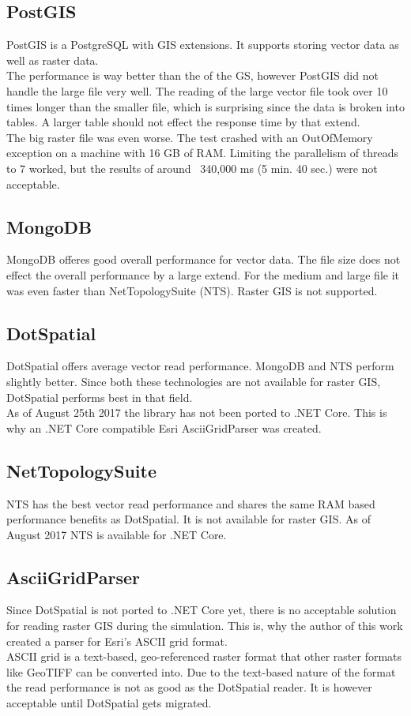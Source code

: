 \subsection{PostGIS}
PostGIS is a PostgreSQL with GIS extensions. It supports storing vector data as well as raster data.\\
The performance is way better than the of the GS, however PostGIS did not handle the large file very well. The reading of the large vector file took over 10 times longer than the smaller file, which is surprising since the data is broken into tables. A larger table should not effect the response time by that extend.\\
The big raster file was even worse. The test crashed with an OutOfMemory exception on a machine with 16 GB of RAM. Limiting the parallelism of threads to 7 worked, but the results of around ~340,000 ms (5 min. 40 sec.) were not acceptable.


\subsection{MongoDB}
MongoDB offeres good overall performance for vector data. The file size does not effect the overall performance by a large extend. For the medium and large file it was even faster than NetTopologySuite (NTS). Raster GIS is not supported.


\subsection{DotSpatial}
DotSpatial offers average vector read performance. MongoDB and NTS perform slightly better. Since both these technologies are not available for raster GIS, DotSpatial performs best in that field.\\
As of August 25th 2017 the library has not been ported to .NET Core. This is why an .NET Core compatible Esri AsciiGridParser was created.\\


\subsection{NetTopologySuite}
NTS has the best vector read performance and shares the same RAM based performance benefits as DotSpatial. It is not available for raster GIS. As of August 2017 NTS is available for .NET Core.\\


\subsection{AsciiGridParser}
Since DotSpatial is not ported to .NET Core yet, there is no acceptable solution for reading raster GIS during the simulation. This is, why the author of this work created a parser for Esri's ASCII grid format.\\
ASCII grid is a text-based, geo-referenced raster format that other raster formats like GeoTIFF can be converted into. Due to the text-based nature of the format the read performance is not as good as the DotSpatial reader. It is however acceptable until DotSpatial gets migrated.



